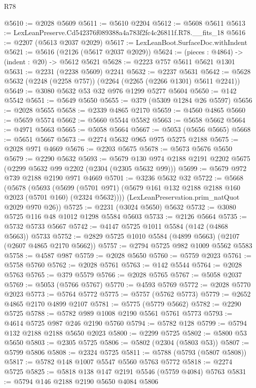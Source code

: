 \begin{lexlean}{R78}
\begin{coremodule}
@5610 := @2028 @5609
@5611 := @5610 @2204
@5612 := @5608 @5611
@5613 := LexLeanPreserve.Cd542376f089388a4a783f2fc4c26811f.R78.__fits_18
@5616 := @2207 (@5613 @2037 @2029)
@5617 := LexLeanBoot.SurfaceDoc.withIndent
@5621 := @5616 (@2126 (@5617 @2037 @2029))
@5624 := (pieces : @4864) -> (indent : @20) -> @5612 @5621
@5628 := @2223 @757 @5611 @5621 @1301
@5631 := @2231 (@2238 @5609) @2241
@5632 := @2237 @5631
@5642 := @5628 @5632 (@2248 (@2258 @757)) (@2264 (@2265 (@2266 @1301) @5611 @2241))
@5649 := @3080 @5632 @53 @32 @976 @1299 @5277 @5604
@5650 := @142 @5542
@5651 := @5649 @5650
@5655 := @379 (@5309 @1284 @26 @5597)
@5656 := @2028 @5655
@5658 := @2339 @4865 @2170
@5659 := @4560 @4865
@5660 := @5659 @5574
@5662 := @5660 @5544 @5582
@5663 := @5658 @5662
@5664 := @4971 @5663
@5665 := @5058 @5664
@5667 := @5053 (@5656 @5665)
@5668 := @5651 @5667
@5673 := @2274 @5632 @965 @975 @5275 @2188
@5675 := @2028 @971 @4669
@5676 := @2203 @5675
@5678 := @5673 @5676 @5650
@5679 := @2290 @5632
@5693 := @5679 @130 @974 @2188 @2191 @2202 @5675 (@2299 @5632 @99 @2202 (@2304 (@2305 @5632 @99)))
@5699 := @5679 @972 @739 @2188 @2190 @971 @4669
@5701 := @3236 @5632 @32
@5722 := @5668
    (@5678
      (@5693
        (@5699 (@5701 @971) (@5679 @161 @132 @2188 @2188 @160 @2023 (@5701 @160) (@2324 @5632))))
      (LexLeanPreservation.prim_natQuot @2029 @970 @26))
@5725 := @2231 (@3024 @5650) @5632
@5732 := @3080 @5725 @116 @48 @1012 @1298 @5584 @5603
@5733 := @2126 @5664
@5735 := @5732 @5733 @5667
@5742 := @4147 @5725 @1011 @5584 (@142 (@4868 @5663)) @5733
@5752 := @2829 @5725 @1010 @5584 (@4899 @5663) (@2107 (@2607 @4865 @2170 @5662))
@5757 := @2794 @5725 @982 @1009 @5562 @5583
@5758 := @4587 @987
@5759 := @2028 @5650
@5760 := @5759 @2023
@5761 := @5758 @5760
@5762 := @2028 @5761
@5763 := @142 @5544
@5764 := @2028 @5763
@5765 := @379 @5579
@5766 := @2028 @5765
@5767 := @5058 @2037
@5769 := @5053 (@5766 @5767)
@5770 := @4593 @5769
@5772 := @2028 @5770 @2023
@5773 := @5764 @5772
@5775 := @5757 (@5762 @5773)
@5779 := @2652 @4865 @2170 @4899 @2107
@5781 := @5775 (@5779 @5662)
@5782 := @2290 @5725
@5788 := @5782 @989 @1008 @2190 @5561 @5761 @5773
@5793 := @4614 @5725 @987 @246 @2190 @5760
@5794 := @5782 @128
@5799 := @5794 @132 @2188 @2188 @5650 @2023
@5800 := @2299 @5725
@5802 := @5800 @53 @5650
@5803 := @2305 @5725
@5806 := @5802 (@2304 (@5803 @53))
@5807 := @5799 @5806
@5808 := @2324 @5725
@5811 := @5788 (@5793 (@5807 @5808))
@5817 := @5782 @148 @1007 @5547 @5560 @5763 @5772
@5818 := @2274 @5725
@5825 := @5818 @138 @147 @2191 @5546 (@5759 @4084) @5763
@5831 := @5794 @146 @2188 @2190 @5650 @4084 @5806

\end{coremodule}
\end{lexlean}
